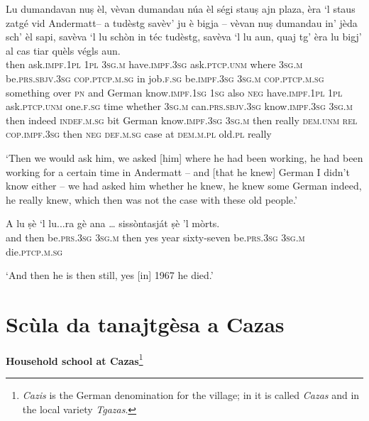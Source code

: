 \begin{linenumbers}
\gll Lu dumandavan nuṣ èl, vèvan dumandau núa èl ségi stauṣ ajn plaza, èra `l staus zatgé vid Andermatt– a tudèstg savèv’ ju è bigja – vèvan nuṣ dumandau in' jèda sch’ èl sapi, savèva `l lu schòn in téc tudèstg, savèva `l lu aun, quaj tg’ èra lu bigj' al cas tiar quèls végls aun.   \\
then ask.\textsc{impf.1pl} \textsc{1pl} \textsc{3sg.m} have.\textsc{impf.3sg}  ask.\textsc{ptcp.unm} where \textsc{3sg.m} be.\textsc{prs.sbjv.3sg} \textsc{cop.ptcp.m.sg} in job.\textsc{f.sg} be.\textsc{impf.3sg} \textsc{3sg.m}  \textsc{cop.ptcp.m.sg} something over \textsc{pn} and German know.\textsc{impf.1sg} \textsc{1sg} also \textsc{neg} {} have.\textsc{impf.1pl} \textsc{1pl} ask.\textsc{ptcp.unm} one.\textsc{f.sg} time whether \textsc{3sg.m} can.\textsc{prs.sbjv.3sg} know.\textsc{impf.3sg} \textsc{3sg.m} then indeed \textsc{indef.m.sg} bit German know.\textsc{impf.3sg} \textsc{3sg.m} then really \textsc{dem.unm} \textsc{rel} \textsc{cop.impf.3sg} then \textsc{neg} \textsc{def.m.sg} case at \textsc{dem.m.pl} old.\textsc{pl} really \\
\end{linenumbers}
\medskip
\glt `Then we would ask him, we asked [him] where he had been working, he had been working for a certain time in Andermatt – and [that he knew] German I didn't know either – we had asked him whether he knew, he knew some German indeed, he really knew, which then was not the case with these old people.'
\medskip

\begin{linenumbers}
\gll  A lu ṣè `l lu...ra gè ana … sissòntasját ṣè 'l mòrts. \\
and then be.\textsc{prs.3sg} \textsc{3sg.m} then yes year {} sixty-seven be.\textsc{prs.3sg} \textsc{3sg.m} die.\textsc{ptcp.m.sg} \\
\end{linenumbers}
\medskip
\glt `And then he is then still, yes [in] 1967 he died.'
\medskip


\section{Scùla da tanajtgèsa a Cazas}\label{sec:8.4}

\noindent
\textbf{Household school at Cazas}\footnote{\textit{Cazis} is the German denomination for the village; in  it is called \textit{Cazas} and in the local  variety \textit{Tgazas}.}

